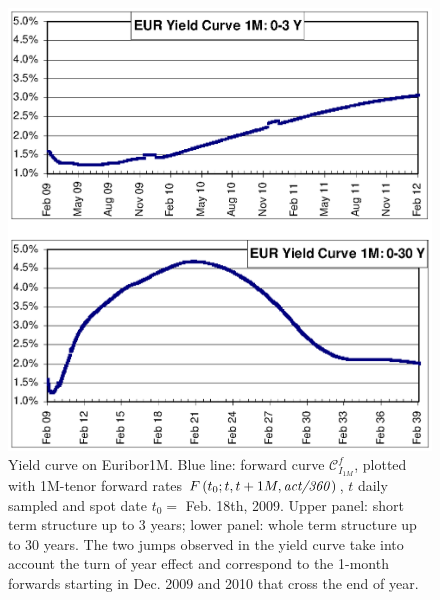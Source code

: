 \documentclass[11pt,reqno]{amsart}
\begin{document}
\begin{figure}[p]
\centering
\includegraphics[scale=1.0]{../figures/FigYC1M}
\caption{Yield curve on Euribor1M. Blue line: forward curve $\mathcal{C}_{I_{1M}}^f$, plotted with 1M-tenor forward rates $F\left( t_{0};t,t+1M,\text{\textit{act/360}}\right)$, $t$ daily sampled and spot date $t_{0}=$ Feb. 18th, 2009. Upper panel: short term structure up to 3 years; lower panel: whole term structure up to 30 years. The two jumps observed in the yield curve take into account the turn of year effect and correspond to the 1-month forwards starting in Dec. 2009 and 2010 that cross the end of year.}
\label{FigYC1M}
\end{figure}
\end{document}
